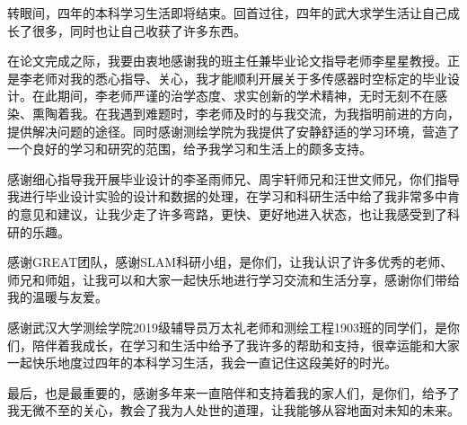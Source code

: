 
转眼间，四年的本科学习生活即将结束。回首过往，四年的武大求学生活让自己成长了很多，同时也让自己收获了许多东西。

在论文完成之际，我要由衷地感谢我的班主任兼毕业论文指导老师李星星教授。正是李老师对我的悉心指导、关心，我才能顺利开展关于多传感器时空标定的毕业设计。在此期间，李老师严谨的治学态度、求实创新的学术精神，无时无刻不在感染、熏陶着我。在我遇到难题时，李老师及时的与我交流，为我指明前进的方向，提供解决问题的途径。同时感谢测绘学院为我提供了安静舒适的学习环境，营造了一个良好的学习和研究的范围，给予我学习和生活上的颇多支持。

感谢细心指导我开展毕业设计的李圣雨师兄、周宇轩师兄和汪世文师兄，你们指导我进行毕业设计实验的设计和数据的处理，在学习和科研生活中给了我非常多中肯的意见和建议，让我少走了许多弯路，更快、更好地进入状态，也让我感受到了科研的乐趣。

感谢GREAT团队，感谢SLAM科研小组，是你们，让我认识了许多优秀的老师、师兄和师姐，让我可以和大家一起快乐地进行学习交流和生活分享，感谢你们带给我的温暖与友爱。

感谢武汉大学测绘学院2019级辅导员万太礼老师和测绘工程1903班的同学们，是你们，陪伴着我成长，在学习和生活中给予了我许多的帮助和支持，很幸运能和大家一起快乐地度过四年的本科学习生活，我会一直记住这段美好的时光。

最后，也是最重要的，感谢多年来一直陪伴和支持着我的家人们，是你们，给予了我无微不至的关心，教会了我为人处世的道理，让我能够从容地面对未知的未来。